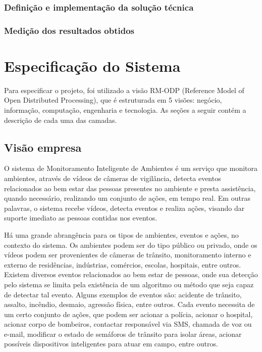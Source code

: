 \documentclass[]{politex}
\begin{document}
\subsection{Definição e implementação da solução técnica}


\subsection{Medição dos resultados obtidos}



\chapter{Especificação do Sistema}
Para especificar o projeto, foi utilizado a visão RM-ODP (Reference Model of Open Distributed Processing), que é estruturada em 5 visões: negócio, informação, computação, engenharia e tecnologia. As seções a seguir contém a descrição de cada uma das camadas.

\section{Visão empresa}
O sistema de Monitoramento Inteligente de Ambientes é um serviço que monitora ambientes, através de vídeos de câmeras de vigilância, detecta eventos relacionados ao bem estar das pessoas presentes no ambiente e presta assistência, quando necessário, realizando um conjunto de ações, em tempo real. Em outras palavras, o sistema recebe vídeos, detecta eventos e realiza ações, visando dar suporte imediato as pessoas contidas nos eventos.

Há uma grande abrangência para os tipos de ambientes, eventos e ações, no contexto do sistema. Os ambientes podem ser do tipo público ou privado, onde os vídeos podem ser provenientes de câmeras de trânsito, monitoramento interno e externo de residências, indústrias, comércios, escolas, hospitais, entre outros. Existem diversos eventos relacionados ao bem estar de pessoas, onde sua detecção pelo sistema se limita pela existência de um algoritmo ou método que seja capaz de detectar tal evento. Alguns exemplos de eventos são: acidente de trânsito, assalto, incêndio, desmaio, agressão física, entre outros. Cada evento necessita de um certo conjunto de ações, que podem ser acionar a polícia, acionar o hospital, acionar corpo de bombeiros, contactar responsável via SMS, chamada de voz ou e-mail, modificar o estado de semáforos de trânsito para isolar áreas, acionar possíveis dispositivos inteligentes para atuar em campo, entre outros.
\end{document}
